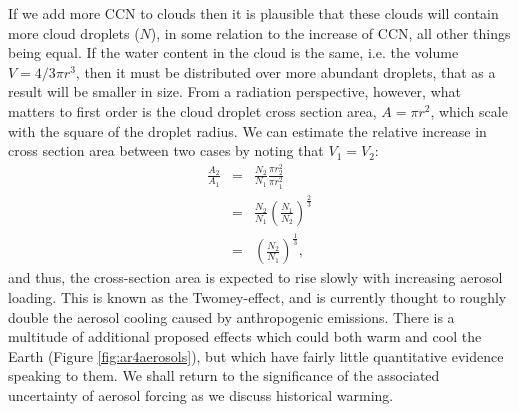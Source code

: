 \documentclass[12pt]{book}
\begin{document}
If we add more CCN to clouds then it is plausible that these clouds will contain more cloud droplets ($N$), in some relation to the increase of CCN, all other things being equal. If the water content in the cloud is the same, i.e. the volume $V=4/3 \pi r^3$, then it must be distributed over more abundant droplets, that as a result will be smaller in size. From a radiation perspective, however, what matters to first order is the cloud droplet cross section area, $A=\pi r^2$, which scale with the square of the droplet radius. We can estimate the relative increase in cross section area between two cases by noting that $V_1=V_2$:
\begin{eqnarray}
\frac{A_2}{A_1} &=& \frac{N_2}{N_1}  \frac{\pi r_2^2}{\pi r_1^2} \nonumber \\
 &=& \frac{N_2}{N_1}  \left( \frac{N_1}{N_2} \right)^\frac{2}{3} \nonumber \\
 &=& \left( \frac{N_2}{N_1} \right)^\frac{1}{3}, \nonumber 
\end{eqnarray}
and thus, the cross-section area is expected to rise slowly with increasing aerosol loading. This is known as the Twomey-effect, and is currently thought to roughly double the aerosol cooling caused by anthropogenic emissions. There is a multitude of additional proposed effects which could both warm and cool the Earth (Figure \ref{fig:ar4aerosols}), but which have fairly little quantitative evidence speaking to them. We shall return to the significance of the associated uncertainty of aerosol forcing as we discuss historical warming.
\end{document}
